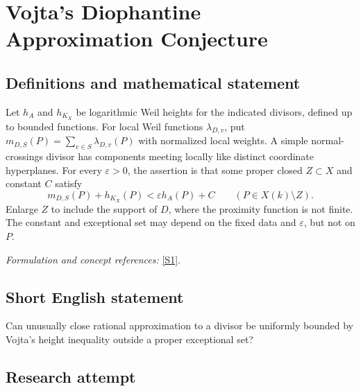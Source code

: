 \documentclass[11pt,a4paper]{article}
\newcommand{\sref}[2]{\hyperlink{source:#1:#2}{[S#2]}}
\newif\ifshowcatalogue
\newcommand{\cataloguescope}[1]{\ifshowcatalogue
 \paragraph{Exact scope in the supplied catalogue.}
 \begin{quote}\small #1\end{quote}\fi}
\numberwithin{equation}{section}
\begin{document}
\setcounter{section}{0}
\clearpage
\section*{\texorpdfstring{Vojta's Diophantine Approximation Conjecture}{Vojta's Diophantine Approximation Conjecture}}\label{30005098}
\subsection{Definitions and mathematical statement}
Let $h_A$ and $h_{K_X}$ be logarithmic Weil heights for the indicated divisors, defined up to bounded functions. For local Weil functions $\lambda_{D,v}$, put $m_{D,S}(P)=\sum_{v\in S}\lambda_{D,v}(P)$ with normalized local weights. A simple normal-crossings divisor has components meeting locally like distinct coordinate hyperplanes. For every $\varepsilon>0$, the assertion is that some proper closed $Z\subset X$ and constant $C$ satisfy
\[
 m_{D,S}(P)+h_{K_X}(P)<\varepsilon h_A(P)+C
 \qquad(P\in X(k)\setminus Z).
\]
Enlarge $Z$ to include the support of $D$, where the proximity function is not finite. The constant and exceptional set may depend on the fixed data and $\varepsilon$, but not on $P$.
\par\smallskip\textit{Formulation and concept references:} \sref{30005098}{1}.
\cataloguescope{Let k be a number field, X a smooth projective variety over k, K\_X a canonical divisor, A an ample divisor, D an effective simple normal-crossings divisor, and S a finite set of places containing the archimedean places. Prove that for every epsilon > 0 there are a proper Zariski-closed subset Z of X and a constant C such that m\_\{D,S\}(P)+h\_\{K\_X\}(P) < epsilon h\_A(P)+C for every P in X(k) outside Z.}
\subsection{Short English statement}
Can unusually close rational approximation to a divisor be uniformly bounded by Vojta's height inequality outside a proper exceptional set?
\subsection{Research attempt}
\end{document}
